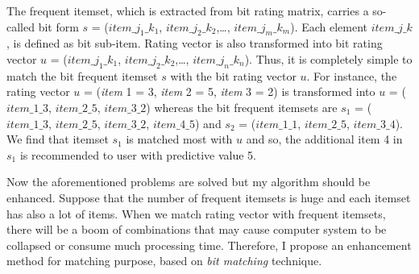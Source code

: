 \documentclass[10pt]{article}
\begin{document}
The frequent itemset, which is extracted from bit rating matrix, carries a so-called bit form $s$ = ($item\_j_1\_k_1$, $item\_j_2\_k_2$,\ldots, $item\_j_m\_k_m$). Each element $item\_j\_k$, is defined as bit sub-item. Rating vector is also transformed into bit rating vector $u$ = ($item\_j_1\_k_1$, $item\_j_2\_k_2$,\ldots, $item\_j_n\_k_n$). Thus, it is completely simple to match the bit frequent itemset $s$ with the bit rating vector $u$. For instance, the rating vector $u$ = (\textit{item} 1 = 3, \textit{item} 2 = 5, \textit{item} 3 = 2) is transformed into $u$ = ($item\_1\_3$, $item\_2\_5$, $item\_3\_2$) whereas the bit frequent itemsets are $s_1$ = ($item\_1\_3$, $item\_2\_5$, $item\_3\_2$, $item\_4\_5$) and $s_2$ = ($item\_1\_1$, $item\_2\_5$, $item\_3\_4$). We find that itemset $s_1$ is matched most with $u$ and so, the additional item 4 in $s_1$ is recommended to user with predictive value 5.

Now the aforementioned problems are solved but my algorithm should be enhanced. Suppose that the number of frequent itemsets is huge and each itemset has also a lot of items. When we match rating vector with frequent itemsets, there will be a boom of combinations that may cause computer system to be collapsed or consume much processing time. Therefore, I propose an enhancement method for matching purpose, based on \textit{bit matching} technique.
\end{document}
